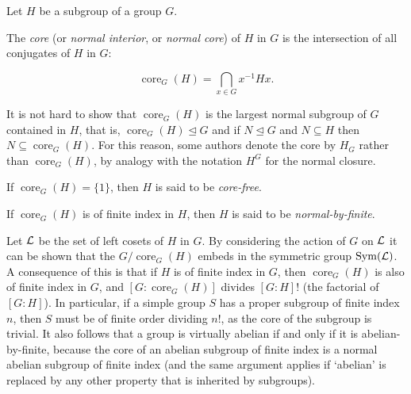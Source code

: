\documentclass[12pt]{article}
\def\normal{\trianglelefteq}
\DeclareMathOperator{\Sym}{Sym}
\DeclareMathOperator{\coreop}{core}
\def\core#1#2{{\coreop}_{#1}(#2)}
\begin{document}

Let $H$ be a subgroup of a group $G$.

The \emph{core} (or \emph{normal interior}, or \emph{normal core}) of $H$ in $G$ 
is the intersection of all conjugates of $H$ in $G$:

\[ \core{G}{H} = \bigcap_{x\in G}x^{-1}Hx. \]

It is not hard to show that
$\core{G}{H}$ is the largest normal subgroup of $G$ contained in $H$,
that is, $\core{G}{H}\normal G$ and
if $N\normal G$ and $N\subseteq H$ then $N\subseteq\core{G}{H}$.
For this reason, some authors denote the core by $H_G$
rather than $\core{G}{H}$,
by analogy with the notation $H^G$ for the normal closure.

If $\core{G}{H}=\{1\}$, 
then $H$ is said to be \emph{core-free}.

If $\core{G}{H}$ is of finite index in $H$,
then $H$ is said to be \emph{normal-by-finite}.

Let $\cal L$ be the set of left cosets of $H$ in $G$.
By considering the action of $G$ on $\cal L$ it can be shown that 
the  $G/\core{G}{H}$ embeds in the symmetric group $\Sym({\cal L})$.
A consequence of this is that if $H$ is of finite index in $G$,
then $\core{G}{H}$ is also of finite index in $G$,
and $[G:\core{G}{H}]$ divides $[G:H]!$ (the factorial of $[G:H]$).
In particular, if a simple group $S$ has a proper subgroup of finite index $n$,
then $S$ must be of finite order dividing $n!$, 
as the core of the subgroup is trivial.
It also follows that 
a group is virtually abelian if and only if it is abelian-by-finite,
because the core of an abelian subgroup of finite index 
is a normal abelian subgroup of finite index
(and the same argument applies if `abelian' is replaced by 
any other property that is inherited by subgroups).
\end{document}
